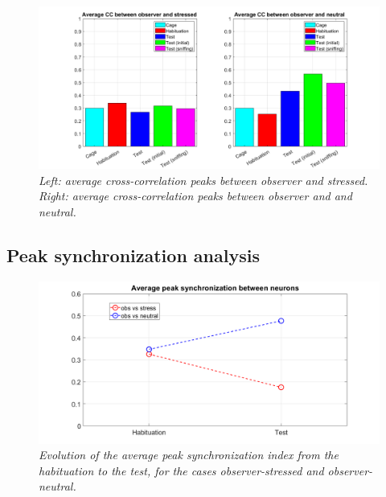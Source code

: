 \documentclass[12pt, a4paper]{article}
\begin{document}
\begin{figure}[H]
	
	\begin{center}
		\hspace*{-1.4cm}
		\includegraphics[scale=.4]{cc_average.png} 
	\end{center} 
	\caption{\textit{Left: average cross-correlation peaks between observer and stressed. Right: average cross-correlation peaks between observer and and neutral.}}
	\label{cc_average}
\end{figure}



\subsection{Peak synchronization analysis}

\begin{figure}[H]
	
	\begin{center}
		\hspace*{-1.4cm}
		\includegraphics[scale=.4]{avg_pks.png} 
	\end{center} 
	\caption{\textit{Evolution of the average peak synchronization index from the habituation to the test, for the cases observer-stressed and observer-neutral.}} \label{avg_pks}
	
\end{figure}
\end{document}
